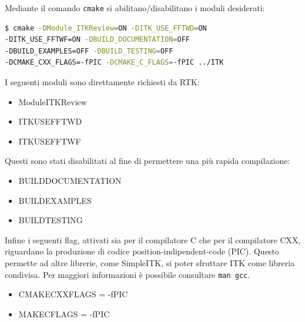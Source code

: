 \documentclass[a4paper,12pt, doubleside]{report}
\begin{document}
                    \bigskip
                    Mediante il comando \texttt{cmake} si abilitano/disabilitano i moduli desiderati:
                    
                    \begin{lstlisting}[language=bash, frame=bt]
$ cmake -DModule_ITKReview=ON -DITK_USE_FFTWD=ON 
-DITK_USE_FFTWF=ON -DBUILD_DOCUMENTATION=OFF 
-DBUILD_EXAMPLES=OFF -DBUILD_TESTING=OFF 
-DCMAKE_CXX_FLAGS=-fPIC -DCMAKE_C_FLAGS=-fPIC ../ITK
                    \end{lstlisting}
                    
                    I seguenti moduli sono direttamente richiesti da RTK:
                    \begin{itemize}
                        \item Module\textunderscore ITKReview
                        \item ITK\textunderscore USE\textunderscore FFTWD
                        \item ITK\textunderscore USE\textunderscore FFTWF
                    \end{itemize}
                    
                    Questi sono stati disabilitati al fine di permettere una più rapida compilazione:
                    
                    \begin{itemize}
                        \item BUILD\textunderscore DOCUMENTATION
                        \item BUILD\textunderscore EXAMPLES
                        \item BUILD\textunderscore TESTING
                    \end{itemize}
                    
                    Infine i seguenti flag, attivati sia per il compilatore C che per il compilatore CXX, riguardano la produzione di codice position-indipendent-code (PIC). Questo permette ad altre librerie, come SimpleITK, si poter sfruttare ITK come libreria condivisa. Per maggiori informazioni è possibile consultare \texttt{man gcc}. 
                    
                    \begin{itemize}
                        \item CMAKE\textunderscore CXX\textunderscore FLAGS = -fPIC
                        \item MAKE\textunderscore C\textunderscore FLAGS = -fPIC
                    \end{itemize}
                    
\end{document}
